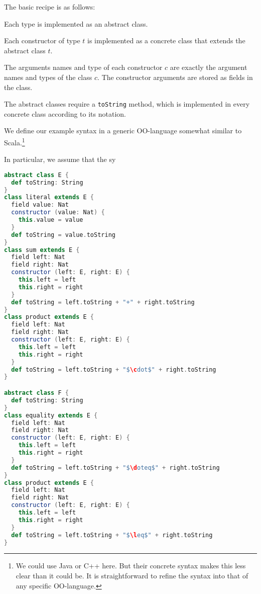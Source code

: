 The basic recipe is as follows:
\begin{compactitem}
\item Each type is implemented as an abstract class.
\item Each constructor of type $t$ is implemented as a concrete class that extends the abstract class $t$.
\item The arguments names and type of each constructor $c$ are exactly the argument names and types of the class $c$.
The constructor arguments are stored as fields in the class.
\item The abstract classes require a \texttt{toString} method, which is implemented in every concrete class according to its notation.
\end{compactitem}


\begin{example}
We define our example syntax in a generic OO-language somewhat similar to Scala.\footnote{We could use Java or C++ here. But their concrete syntax makes this less clear than it could be. It is straightforward to refine the syntax into that of any specific OO-language.}

In particular, we assume that the sy

	\begin{lstlisting}[language=scala]
abstract class E {
  def toString: String
}
class literal extends E {
  field value: Nat
  constructor (value: Nat) {
    this.value = value
  }
  def toString = value.toString
}
class sum extends E {
  field left: Nat
  field right: Nat
  constructor (left: E, right: E) {
    this.left = left
    this.right = right
  }
  def toString = left.toString + "+" + right.toString
}
class product extends E {
  field left: Nat
  field right: Nat
  constructor (left: E, right: E) {
    this.left = left
    this.right = right
  }
  def toString = left.toString + "$\cdot$" + right.toString
}

abstract class F {
  def toString: String
}
class equality extends E {
  field left: Nat
  field right: Nat
  constructor (left: E, right: E) {
    this.left = left
    this.right = right
  }
  def toString = left.toString + "$\doteq$" + right.toString
}
class product extends E {
  field left: Nat
  field right: Nat
  constructor (left: E, right: E) {
    this.left = left
    this.right = right
  }
  def toString = left.toString + "$\leq$" + right.toString
}
\end{lstlisting}
\end{example}

